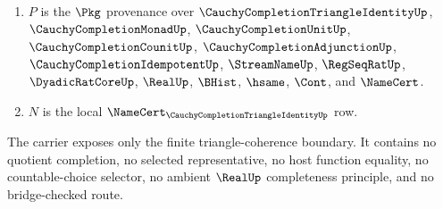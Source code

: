 \begin{definition}
\begin{enumerate}
\item $P$ is the $\Pkg$ provenance over $\CauchyCompletionTriangleIdentityUp$, $\CauchyCompletionMonadUp$, $\CauchyCompletionUnitUp$, $\CauchyCompletionCounitUp$, $\CauchyCompletionAdjunctionUp$, $\CauchyCompletionIdempotentUp$, $\StreamNameUp$, $\RegSeqRatUp$, $\DyadicRatCoreUp$, $\RealUp$, $\BHist$, $\hsame$, $\Cont$, and $\NameCert$.
\item $N$ is the local $\NameCert_{\CauchyCompletionTriangleIdentityUp}$ row.
\end{enumerate}
The carrier exposes only the finite triangle-coherence boundary. It contains no quotient completion, no selected representative, no host function equality, no countable-choice selector, no ambient $\RealUp$ completeness principle, and no bridge-checked route.
\end{definition}

